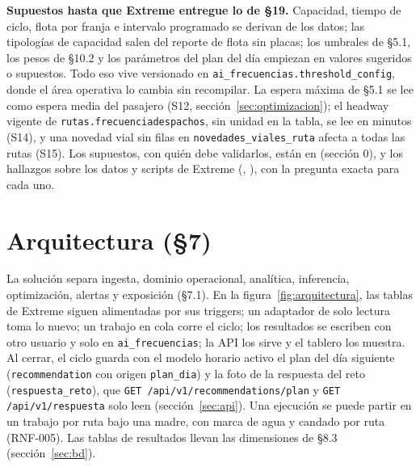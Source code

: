 \documentclass[10pt,a4paper]{article}
\begin{document}
\textbf{Supuestos hasta que Extreme entregue lo de §19.} Capacidad, tiempo de ciclo, flota por franja e intervalo
programado se derivan de los datos; las tipologías de capacidad salen del reporte de flota sin placas; los umbrales de
§5.1, los pesos de §10.2 y los parámetros del plan del día empiezan en valores sugeridos o supuestos. Todo eso vive
versionado en \texttt{ai\_frecuencias.threshold\_config}, donde el área operativa lo cambia sin recompilar. La espera
máxima de §5.1 se lee como espera media del pasajero (S12, sección~\ref{sec:optimizacion}); el headway vigente de
\texttt{rutas.frecuenciadespachos}, sin unidad en la tabla, se lee en minutos (S14), y una novedad vial sin filas en
\texttt{novedades\_viales\_ruta} afecta a todas las rutas (S15). Los supuestos, con quién debe validarlos, están en
 (sección 0), y los \NHallazgosTexto{} hallazgos sobre los datos y scripts de
Extreme (\HallazgosRango, ), con la pregunta exacta para cada uno.

\section{Arquitectura (§7)}
\label{sec:arquitectura}
La solución separa ingesta, dominio operacional, analítica, inferencia, optimización, alertas y exposición (§7.1). En
la figura~\ref{fig:arquitectura}, las tablas de Extreme siguen alimentadas por sus triggers; un adaptador de solo
lectura toma lo nuevo; un trabajo en cola corre el ciclo; los resultados se escriben con otro usuario y solo en
\texttt{ai\_frecuencias}; la API los sirve y el tablero los muestra. Al cerrar, el ciclo guarda con el modelo horario
activo el plan del día siguiente (\texttt{recommendation} con origen \texttt{plan\_dia}) y la foto de la respuesta del reto
(\texttt{respuesta\_reto}), que \texttt{GET /api/v1/recommendations/plan} y \texttt{GET /api/v1/respuesta} solo leen
(sección~\ref{sec:api}). Una ejecución se puede partir en un trabajo por ruta bajo una madre, con marca de agua y
candado por ruta (RNF-005). Las tablas de resultados llevan las dimensiones de §8.3 (sección~\ref{sec:bd}).
\end{document}
